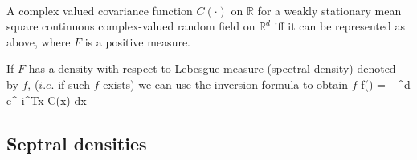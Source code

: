 \begin{thm}\hfill \\
	
	A complex valued covariance function $C(\cdot)$ on $\mathbb{R}$ for a weakly stationary mean square continuous complex-valued random field on $\mathbb{R}^d$ iff it can be represented as above, where $F$ is a positive measure.
\end{thm}

If $F$ has a density with respect to Lebesgue measure (spectral density) denoted by $f$, ($i.e.$ if such $f$ exists) we can use the inversion formula to obtain $f$
\beq 
f(\omega) =   \int_{^d} e^{-i\omega^Tx} C(x) dx 
\eeq

\subsection{Septral densities}


